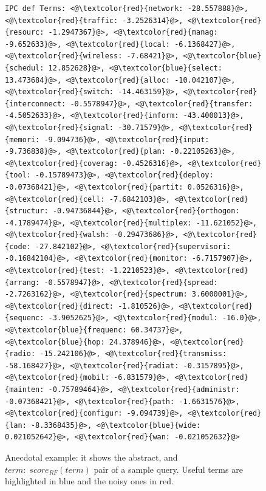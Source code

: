 \begin{figure}[htpb]
\begin{framed}
\begin{lstlisting}[basicstyle=\tiny\ttfamily , linewidth=\columnwidth,breaklines=true]
IPC def Terms: <@\textcolor{red}{network: -28.557888}@>, <@\textcolor{red}{traffic: -3.2526314}@>, <@\textcolor{red}{resourc: -1.2947367}@>, <@\textcolor{red}{manag: -9.652633}@>, <@\textcolor{red}{local: -6.1368427}@>, <@\textcolor{red}{wireless: -7.68421}@>, <@\textcolor{blue}{schedul: 12.852628}@>, <@\textcolor{blue}{select: 13.473684}@>, <@\textcolor{red}{alloc: -10.042107}@>, <@\textcolor{red}{switch: -14.463159}@>, <@\textcolor{red}{interconnect: -0.5578947}@>, <@\textcolor{red}{transfer: -4.5052633}@>, <@\textcolor{red}{inform: -43.400013}@>, <@\textcolor{red}{signal: -30.71579}@>, <@\textcolor{red}{memori: -9.094736}@>, <@\textcolor{red}{input: -9.736838}@>, <@\textcolor{red}{plan: -0.22105263}@>, <@\textcolor{red}{coverag: -0.4526316}@>, <@\textcolor{red}{tool: -0.15789473}@>, <@\textcolor{red}{deploy: -0.07368421}@>, <@\textcolor{red}{partit: 0.0526316}@>, <@\textcolor{red}{cell: -7.6842103}@>, <@\textcolor{red}{structur: -0.94736844}@>, <@\textcolor{red}{orthogon: -4.1789474}@>, <@\textcolor{red}{multiplex: -11.621052}@>, <@\textcolor{red}{walsh: -0.29473686}@>, <@\textcolor{red}{code: -27.842102}@>, <@\textcolor{red}{supervisori: -0.16842104}@>, <@\textcolor{red}{monitor: -6.7157907}@>, <@\textcolor{red}{test: -1.2210523}@>, <@\textcolor{red}{arrang: -0.5578947}@>, <@\textcolor{red}{spread: -2.7263162}@>, <@\textcolor{red}{spectrum: 3.6000001}@>, <@\textcolor{red}{direct: -1.810526}@>, <@\textcolor{red}{sequenc: -3.9052625}@>, <@\textcolor{red}{modul: -16.0}@>, <@\textcolor{blue}{frequenc: 60.34737}@>, <@\textcolor{blue}{hop: 24.378946}@>, <@\textcolor{red}{radio: -15.242106}@>, <@\textcolor{red}{transmiss: -58.168427}@>, <@\textcolor{red}{radiat: -0.3157895}@>,  <@\textcolor{red}{mobil: -6.831579}@>, <@\textcolor{red}{mainten: -0.75789464}@>, <@\textcolor{red}{administr: -0.07368421}@>, <@\textcolor{red}{path: -1.6631576}@>, <@\textcolor{red}{configur: -9.094739}@>, <@\textcolor{red}{lan: -8.3368435}@>, <@\textcolor{blue}{wide: 0.021052642}@>, <@\textcolor{red}{wan: -0.021052632}@>
 \end{lstlisting} 
 \vspace*{-2ex}
\end{framed}
 \vspace*{-2ex}
  \caption{Anecdotal example: it shows the abstract, and $ term: \; score_{RF}(term) $ pair of a sample query. Useful terms are highlighted in blue and the noisy ones in red.}
  \label{fig:anecdotal}  
\end{figure}

